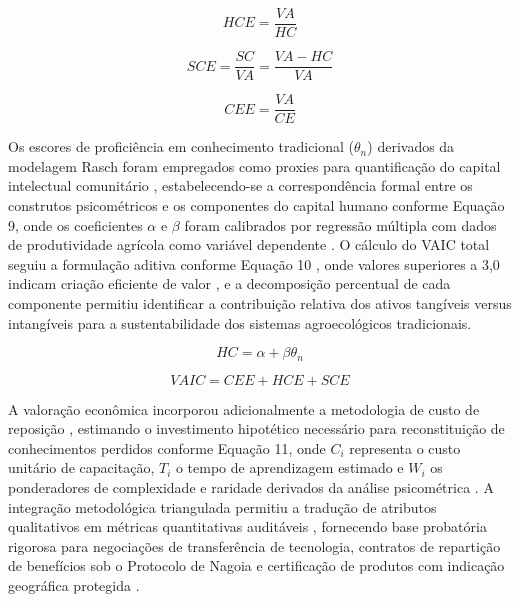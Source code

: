 \begin{equation}
HCE = \frac{VA}{HC}
\end{equation}

\begin{equation}
SCE = \frac{SC}{VA} = \frac{VA - HC}{VA}
\end{equation}

\begin{equation}
CEE = \frac{VA}{CE}
\end{equation}

Os escores de proficiência em conhecimento tradicional ($\theta_n$) derivados da modelagem Rasch foram empregados como proxies para quantificação do capital intelectual comunitário \cite{Sveiby1997}, estabelecendo-se a correspondência formal entre os construtos psicométricos e os componentes do capital humano conforme Equação 9, onde os coeficientes $\alpha$ e $\beta$ foram calibrados por regressão múltipla com dados de produtividade agrícola como variável dependente \cite{Becker1993}. O cálculo do VAIC total seguiu a formulação aditiva conforme Equação 10 \cite{Pulic2000}, onde valores superiores a 3,0 indicam criação eficiente de valor \cite{Iazzolino2013}, e a decomposição percentual de cada componente permitiu identificar a contribuição relativa dos ativos tangíveis versus intangíveis para a sustentabilidade dos sistemas agroecológicos tradicionais.

\begin{equation}
HC = \alpha + \beta\theta_n
\end{equation}

\begin{equation}
VAIC = CEE + HCE + SCE
\end{equation}

A valoração econômica incorporou adicionalmente a metodologia de custo de reposição \cite{Freeman2003}, estimando o investimento hipotético necessário para reconstituição de conhecimentos perdidos conforme Equação 11, onde $C_i$ representa o custo unitário de capacitação, $T_i$ o tempo de aprendizagem estimado e $W_i$ os ponderadores de complexidade e raridade derivados da análise psicométrica \cite{Bateman2002}. A integração metodológica triangulada permitiu a tradução de atributos qualitativos em métricas quantitativas auditáveis \cite{Kaplan2004}, fornecendo base probatória rigorosa para negociações de transferência de tecnologia, contratos de repartição de benefícios sob o Protocolo de Nagoia \cite{Laird2020} e certificação de produtos com indicação geográfica protegida \cite{Belletti2015}.


